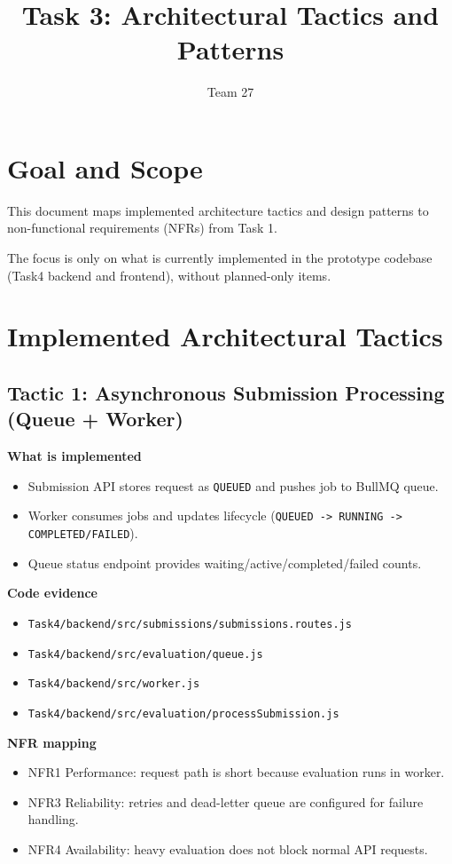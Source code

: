 \documentclass[12pt,journal,onecolumn]{IEEEtran}
\begin{document}
\title{Task 3: Architectural Tactics and Patterns}
\author{Team 27}
\maketitle

\section{Goal and Scope}

This document maps implemented architecture tactics and design patterns to non-functional requirements (NFRs) from Task 1.

The focus is only on what is currently implemented in the prototype codebase (Task4 backend and frontend), without planned-only items.

\section{Implemented Architectural Tactics}

\subsection{Tactic 1: Asynchronous Submission Processing (Queue + Worker)}

\textbf{What is implemented}
\begin{itemize}
    \item Submission API stores request as \texttt{QUEUED} and pushes job to BullMQ queue.
    \item Worker consumes jobs and updates lifecycle (\texttt{QUEUED -> RUNNING -> COMPLETED/FAILED}).
    \item Queue status endpoint provides waiting/active/completed/failed counts.
\end{itemize}

\textbf{Code evidence}
\begin{itemize}
    \item \texttt{Task4/backend/src/submissions/submissions.routes.js}
    \item \texttt{Task4/backend/src/evaluation/queue.js}
    \item \texttt{Task4/backend/src/worker.js}
    \item \texttt{Task4/backend/src/evaluation/processSubmission.js}
\end{itemize}

\textbf{NFR mapping}
\begin{itemize}
    \item NFR1 Performance: request path is short because evaluation runs in worker.
    \item NFR3 Reliability: retries and dead-letter queue are configured for failure handling.
    \item NFR4 Availability: heavy evaluation does not block normal API requests.
\end{itemize}
\end{document}
